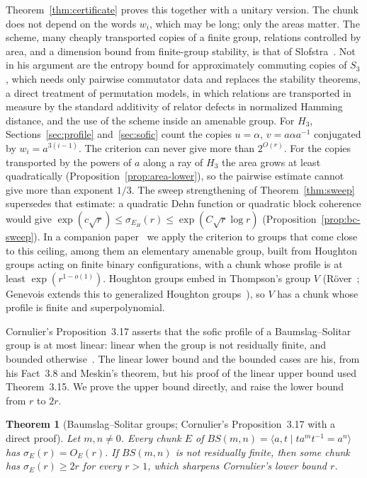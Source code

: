\documentclass[11pt,a4paper]{article}
\theoremstyle{plain}
\newtheorem{theorem}{Theorem}[section]
\theoremstyle{definition}
\theoremstyle{remark}
\begin{document}
Theorem~\ref{thm:certificate} proves this together with a unitary version. The chunk does not depend on the words $w_i$, which may be long;
only the areas matter. The scheme, many cheaply transported copies of a finite group, relations controlled by area, and a dimension bound
from finite-group stability, is that of Slofstra~\cite[Sections~2 and~3]{Slofstra2018}. Not in his argument are the entropy bound for
approximately commuting copies of $S_3$, which needs only pairwise commutator data and replaces the stability theorems, a direct treatment
of permutation models, in which relations are transported in measure by the standard additivity of relator defects in normalized Hamming
distance, and the use of the scheme inside an amenable group. For $H_3$, Sections~\ref{sec:profile} and~\ref{sec:sofic} count the copies $u=\alpha$, $v=a\alpha a^{-1}$ conjugated
by $w_i=a^{3(i-1)}$. The criterion can never give more than $2^{O(r)}$. For the copies transported by the powers of $a$ along a ray of $H_3$
the area grows at least quadratically (Proposition~\ref{prop:area-lower}), so the pairwise estimate cannot give more than exponent $1/3$.
The sweep strengthening of Theorem~\ref{thm:sweep} supersedes that estimate: a quadratic Dehn function or quadratic block coherence would give
$\exp(c\sqrt r)\le\sigma_{E_H}(r)\le\exp(C\sqrt r\log r)$ (Proposition~\ref{prop:bc-sweep}). In a companion
paper~\cite{DouglasMghirbiC} we apply the criterion to groups that come close to this ceiling, among them an elementary amenable group,
built from Houghton groups acting on finite binary configurations, with a chunk whose profile is at least $\exp(r^{1-o(1)})$. Houghton groups
embed in Thompson's group $V$ (Röver~\cite[Proposition~2.6]{Rover1999}; Genevois extends this to generalized Houghton
groups~\cite[Corollary~5.11]{Genevois2019}), so $V$ has a chunk whose profile is finite and superpolynomial.

Cornulier's Proposition~3.17 asserts that the sofic profile of a Baumslag--Solitar group is at most linear: linear when the group is not
residually finite, and bounded otherwise~\cite{Cornulier2013}. The linear lower bound and the bounded cases are his, from his Fact~3.8 and
Meskin's theorem, but his proof of the linear upper bound used Theorem~3.15. We prove the upper bound directly, and raise the lower bound
from $r$ to $2r$.

\begin{theorem}[Baumslag--Solitar groups; Cornulier's Proposition~3.17 with a direct proof]\label{thm:bs-intro}
Let $m,n\ne0$. Every chunk $E$ of $BS(m,n)=\langle a,t\mid ta^mt^{-1}=a^n\rangle$ has $\sigma_E(r)=O_E(r)$. If $BS(m,n)$ is not residually
finite, then some chunk has $\sigma_E(r)\ge2r$ for every $r>1$, which sharpens Cornulier's lower bound $r$.
\end{theorem}
\end{document}
